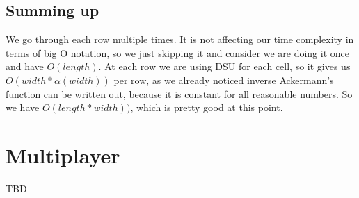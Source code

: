 	\subsection{Summing up}
	We go through each row multiple times. It is not affecting our time complexity in terms of big O notation, so we just skipping it and consider we are doing it once and have $O(length)$. At each row we are using DSU for each cell, so it gives us $O(width*\alpha{}(width))$ per row, as we already noticed inverse Ackermann's function can be written out, because it is constant for all reasonable numbers. So we have $O(length*width))$, which is pretty good at this point.
	
\section{Multiplayer}
TBD